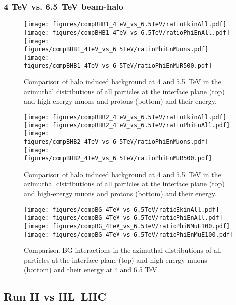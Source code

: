 \subsubsection{4 TeV vs. 6.5~TeV beam-halo}
\begin{figure}
\begin{center}
  \texttt{[image: figures/compBHB1\_4TeV\_vs\_6.5TeV/ratioEkinAll.pdf]}
  \texttt{[image: figures/compBHB1\_4TeV\_vs\_6.5TeV/ratioPhiEnAll.pdf]}
  \texttt{[image: figures/compBHB1\_4TeV\_vs\_6.5TeV/ratioPhiEnMuons.pdf]}
  \texttt{[image: figures/compBHB1\_4TeV\_vs\_6.5TeV/ratioPhiEnMuR500.pdf]}
\end{center}
\vspace{-0.6cm}
 \caption{Comparison of halo induced background at 4 and 6.5~TeV in the azimuthal distributions of all particles at the interface plane (top) and high-energy muons and protons (bottom) and their energy.
  \label{compBHB1run1run2}}
\end{figure}

\begin{figure}[!htb]
\begin{center}
  \texttt{[image: figures/compBHB2\_4TeV\_vs\_6.5TeV/ratioEkinAll.pdf]}
  \texttt{[image: figures/compBHB2\_4TeV\_vs\_6.5TeV/ratioPhiEnAll.pdf]}
  \texttt{[image: figures/compBHB2\_4TeV\_vs\_6.5TeV/ratioPhiEnMuons.pdf]}
  \texttt{[image: figures/compBHB2\_4TeV\_vs\_6.5TeV/ratioPhiEnMuR500.pdf]}
\end{center}
\vspace{-0.6cm}
 \caption{Comparison of halo induced background at 4 and 6.5~TeV in the azimuthal distributions of all particles at the interface plane (top) and high-energy muons and protons (bottom) and their energy.
  \label{compBHB2run1run2}}
\end{figure}



\begin{figure}[!htb]
\begin{center}
  \texttt{[image: figures/compBG\_4TeV\_vs\_6.5TeV/ratioEkinAll.pdf]}
  \texttt{[image: figures/compBG\_4TeV\_vs\_6.5TeV/ratioPhiEnAll.pdf]}
  \texttt{[image: figures/compBG\_4TeV\_vs\_6.5TeV/ratioPhiNMuE100.pdf]}
  \texttt{[image: figures/compBG\_4TeV\_vs\_6.5TeV/ratioPhiEnMuE100.pdf]}
\end{center}
\vspace{-0.6cm}
 \caption{Comparison BG interactions in the azimuthal distributions of all particles at the interface plane (top) and high-energy muons (bottom) and their energy at 4 and 6.5 TeV.
  \label{compBGrun1run2}}
\end{figure}


\subsection{Run II vs HL--LHC}
